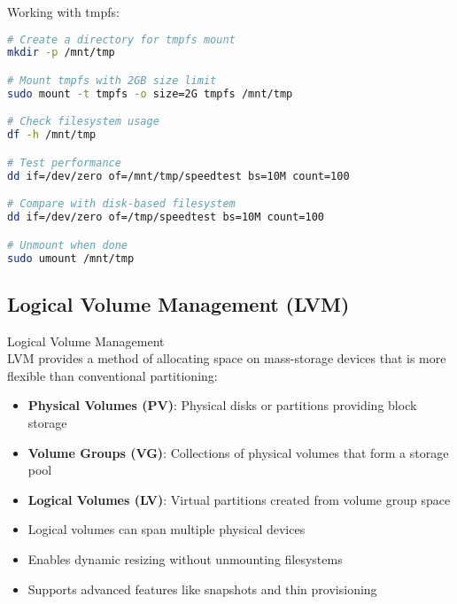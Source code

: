 \begin{example}
    Working with tmpfs:
    
\begin{lstlisting}[language=bash, style=basesmol]
# Create a directory for tmpfs mount
mkdir -p /mnt/tmp

# Mount tmpfs with 2GB size limit
sudo mount -t tmpfs -o size=2G tmpfs /mnt/tmp

# Check filesystem usage
df -h /mnt/tmp

# Test performance
dd if=/dev/zero of=/mnt/tmp/speedtest bs=10M count=100

# Compare with disk-based filesystem
dd if=/dev/zero of=/tmp/speedtest bs=10M count=100

# Unmount when done
sudo umount /mnt/tmp
\end{lstlisting}
\end{example}

\subsection{Logical Volume Management (LVM)}

\begin{definition}{Logical Volume Management}\\
    LVM provides a method of allocating space on mass-storage devices that is more flexible than conventional partitioning:
    \begin{itemize}
        \item \textbf{Physical Volumes (PV)}: Physical disks or partitions providing block storage
        \item \textbf{Volume Groups (VG)}: Collections of physical volumes that form a storage pool
        \item \textbf{Logical Volumes (LV)}: Virtual partitions created from volume group space
        \item Logical volumes can span multiple physical devices
        \item Enables dynamic resizing without unmounting filesystems
        \item Supports advanced features like snapshots and thin provisioning
    \end{itemize}
\end{definition}

